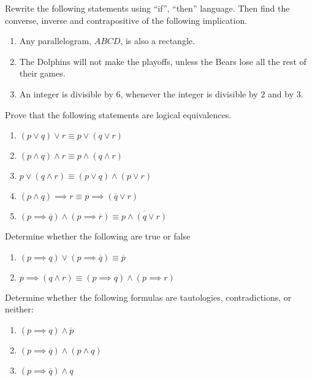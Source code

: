 \documentclass[12pt]{article}
\begin{document}
\begin{qu}
Rewrite the following statements using ``if'', ``then'' language. Then find the converse, inverse and contrapositive of the following implication.
\begin{enumerate}[label=\alph*)]
\item Any parallelogram, $ABCD$, is also a rectangle.
\item The Dolphins will not make the playoffs, unless the Bears lose all the rest of their games.
\item An integer is divisible by $6$, whenever the integer is divisible by $2$ and by $3$.
\end{enumerate}
\end{qu}

\begin{qu}
Prove that the following statements are logical equivalences.
\begin{enumerate}[label=\alph*)]
\item $(p \lor q) \lor r \equiv p \lor (q \lor r)$
\item $(p \land q) \land r \equiv p \land (q \land r)$
\item $p \lor (q \land r) \equiv (p \lor q) \land (p \lor r)$
\item $(p \land q) \implies r \equiv p \implies (\overline{q} \lor r)$
\item $(p \implies \overline{q}) \land (p \implies \overline{r})
		\equiv \overline{p \land (q \lor r)}$
\end{enumerate}
\end{qu}

\begin{qu} Determine whether the following are true or false
\begin{enumerate}[label=\alph*)]
\item $(p \implies q) \lor (p \implies \overline{q}) \equiv \overline{p}$
\item $p \implies (q \land r) \equiv (p \implies q) \land (p \implies r)$
\end{enumerate}
\end{qu}

\begin{qu}
Determine whether the following formulas are tautologies, contradictions, or neither:
\begin{enumerate}[label=\alph*)]
\item $(p \implies q) \land \overline{p}$
\item $(p \implies \overline{q}) \land ( p \land q)$
\item $(p \implies \overline{q}) \land q$
\end{enumerate}
\end{qu}
\end{document}
